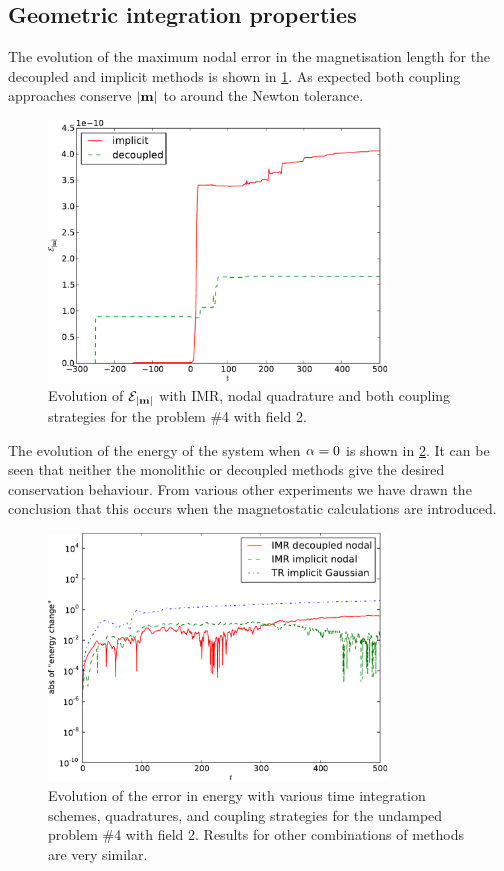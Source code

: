 \subsection{Geometric integration properties}
\label{sec:geom-integr-prop}

The evolution of the maximum nodal error in the magnetisation length for the decoupled and implicit methods is shown in \cref{fig:imr-conservation}.
As expected both coupling approaches conserve $\left|{\boldsymbol{\mathrm{m}}} \right|$ to around the Newton tolerance.
\begin{figure}
  \centering
  \includegraphics[width=0.8\textwidth]{plots/mumag4_ml/mlengtherrormaxesvstimes.pdf}
  \caption{
    Evolution of $\mathcal{E}_{\left|{\boldsymbol{\mathrm{m}}} \right|}$
    with IMR, nodal quadrature and both coupling strategies
    for the \mumag problem \#4 with field 2.
  }
  \label{fig:imr-conservation}
\end{figure}


The evolution of the energy of the system when $\alpha = 0$ is shown in \cref{fig:energy-conservation}.
It can be seen that neither the monolithic or decoupled methods give the desired conservation behaviour.
From various other experiments we have drawn the conclusion that this occurs when the magnetostatic calculations are introduced.
\begin{figure}
  \centering
  \includegraphics[width=0.8\textwidth]
  {plots/sq_mumag4_energy_conservation/absofenergychangevstimes.pdf}
  \caption{
    Evolution of the error in energy
    with various time integration schemes, quadratures, and coupling strategies
    for the undamped \mumag problem \#4 with field 2.
    Results for other combinations of methods are very similar.
  }
  \label{fig:energy-conservation}
\end{figure}

